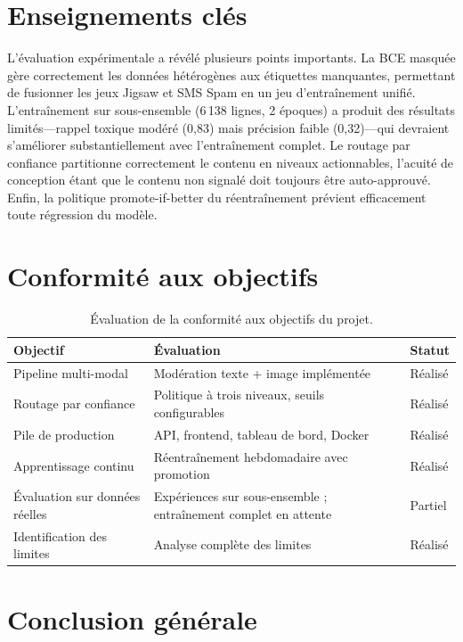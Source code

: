 \section{Enseignements clés}

L'évaluation expérimentale a révélé plusieurs points importants. La BCE masquée gère correctement les données hétérogènes aux étiquettes manquantes, permettant de fusionner les jeux Jigsaw et SMS Spam en un jeu d'entraînement unifié. L'entraînement sur sous-ensemble (6\,138 lignes, 2 époques) a produit des résultats limités---rappel toxique modéré (0,83) mais précision faible (0,32)---qui devraient s'améliorer substantiellement avec l'entraînement complet. Le routage par confiance partitionne correctement le contenu en niveaux actionnables, l'acuité de conception étant que le contenu non signalé doit toujours être auto-approuvé. Enfin, la politique promote-if-better du réentraînement prévient efficacement toute régression du modèle.

\section{Conformité aux objectifs}

\begin{table}[H]
\centering
\caption{Évaluation de la conformité aux objectifs du projet.}
\label{tab:objectives}
\begin{tabularx}{\textwidth}{lXl}
\toprule
\textbf{Objectif} & \textbf{Évaluation} & \textbf{Statut} \\
\midrule
Pipeline multi-modal & Modération texte + image implémentée & Réalisé \\
Routage par confiance & Politique à trois niveaux, seuils configurables & Réalisé \\
Pile de production & API, frontend, tableau de bord, Docker & Réalisé \\
Apprentissage continu & Réentraînement hebdomadaire avec promotion & Réalisé \\
Évaluation sur données réelles & Expériences sur sous-ensemble ; entraînement complet en attente & Partiel \\
Identification des limites & Analyse complète des limites & Réalisé \\
\bottomrule
\end{tabularx}
\end{table}

\section{Conclusion générale}

